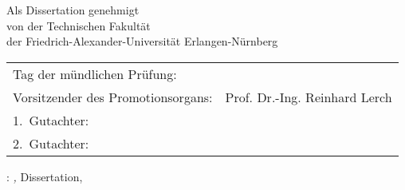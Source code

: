 \thispagestyle{empty}


\vspace{4cm}
\begin{center}
        Als Dissertation genehmigt\\
        von der Technischen Fakultät\\
        der Friedrich-Alexander-Universität Erlangen-Nürnberg
\end{center}
    

\vspace{2cm}
\begin{tabular}{ll}
    Tag der mündlichen Prüfung:& 	 \\

    Vorsitzender des Promotionsorgans: 	& Prof. Dr.-Ing. Reinhard Lerch  \\
    1.~Gutachter: 		& \myProf\\
    2.~Gutachter: 		& \myOtherProf\\

\end{tabular}

\vfill

\noindent\myName: \textit{\myTitle,} Dissertation,
\textcopyright\ \myTime

    
\bigskip

